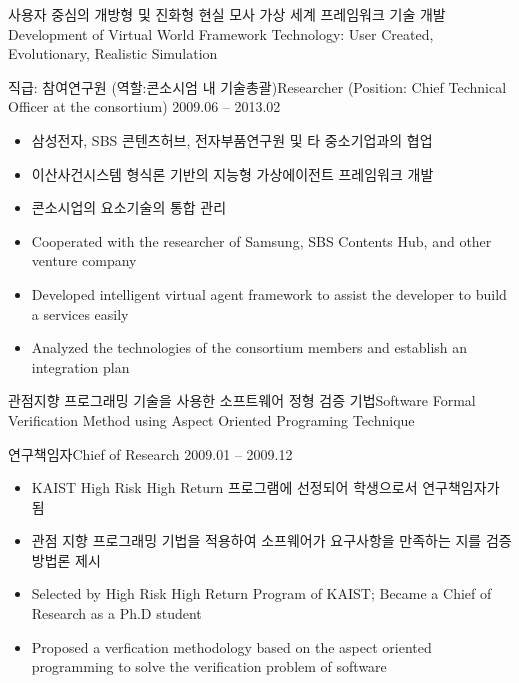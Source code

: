 \documentclass[english,full]{resume_structure}
\begin{document}
\begin{Project}
{사용자 중심의 개방형 및 진화형 현실 모사 가상 세계 프레임워크 기술 개발}{Development of Virtual World Framework Technology: User Created, Evolutionary, Realistic Simulation}
{}{} 
{
\ResumeSubSection %
    {직급: 참여연구원 (역할:콘소시엄 내 기술총괄)}{Researcher (Position: Chief Technical Officer at the consortium)}
    {2009.06 -- 2013.02}
    {
      \begin{itemize}
        \item 삼성전자, SBS 콘텐츠허브, 전자부품연구원 및 타 중소기업과의 협업
        \item 이산사건시스템 형식론 기반의 지능형 가상에이전트 프레임워크 개발
        \item 콘소시업의 요소기술의 통합 관리
      \end{itemize}
    }
    {
      \begin{itemize}
        \item Cooperated with the researcher of Samsung, SBS Contents Hub, and other venture company
        \item Developed intelligent virtual agent framework to assist the developer to build a services easily
        \item Analyzed the technologies of the consortium members and establish an integration plan
      \end{itemize}
    }
}

{관점지향 프로그래밍 기술을 사용한 소프트웨어 정형 검증 기법}{Software Formal Verification Method using Aspect Oriented Programing Technique}
{}{} 
{
\ResumeSubSection %
    {연구책임자}{Chief of Research}
    {2009.01 -- 2009.12}
    {
      \begin{itemize}
        \item KAIST High Risk High Return 프로그램에 선정되어 학생으로서 연구책임자가 됨
        \item 관점 지향 프로그래밍 기법을 적용하여 소프웨어가 요구사항을 만족하는 지를 검증 방법론 제시
      \end{itemize}
    }
    {
      \begin{itemize}
        \item Selected by High Risk High Return Program of KAIST; Became a Chief of Research as a Ph.D student
        \item Proposed a verfication methodology based on the aspect oriented programming to solve the verification problem of software
      \end{itemize}
    }
}


\end{Project}
\end{document}
